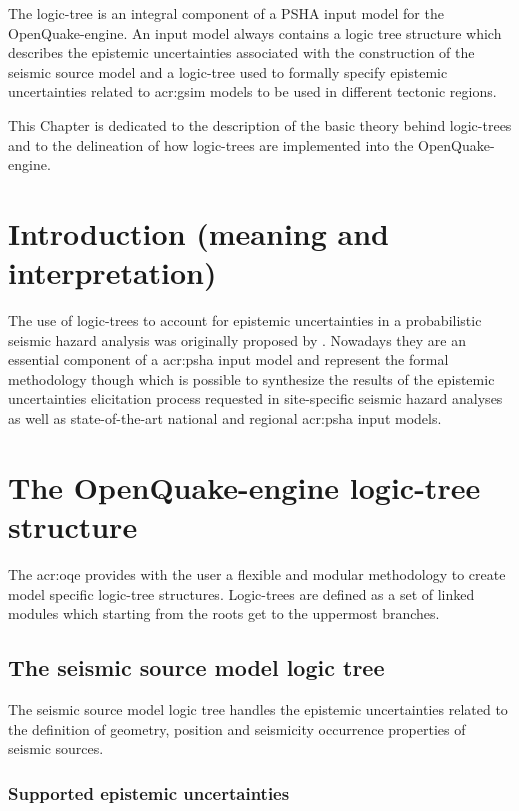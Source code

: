 %
The logic-tree is an integral component of a PSHA input model for the 
OpenQuake-engine. An input model always contains a logic tree structure 
which describes the epistemic uncertainties associated with the construction 
of the seismic source model and a logic-tree used to formally specify 
epistemic uncertainties related to \gls{acr:gsim} models to be used in 
different tectonic regions.

This Chapter is dedicated to the description of the basic theory behind 
logic-trees and to the delineation of how logic-trees are implemented 
into the OpenQuake-engine.
%
\section{Introduction (meaning and interpretation)}
The use of logic-trees to account for epistemic uncertainties in a 
probabilistic seismic hazard analysis was originally proposed by 
\textcite{kulkarni84}.
%
Nowadays they are an essential component of a \gls{acr:psha} input
model and represent the formal methodology though which is possible to 
synthesize the results of the epistemic uncertainties elicitation process
requested in site-specific seismic hazard analyses \parencite{budnitz1997}
as well as state\--of\--the\--art national and regional \gls{acr:psha} 
input models. 
%
\section{The OpenQuake-engine logic-tree structure}
%
The \gls{acr:oqe} provides with the user a flexible and modular methodology 
to create model specific logic-tree structures. Logic-trees are defined as a
set of linked modules which starting from the roots get to the uppermost 
branches.
%
\subsection{The seismic source model logic tree}
The seismic source model logic tree handles the epistemic uncertainties
related to the definition of geometry, position and seismicity occurrence 
properties of seismic sources. 
%
\subsubsection{Supported epistemic uncertainties}

